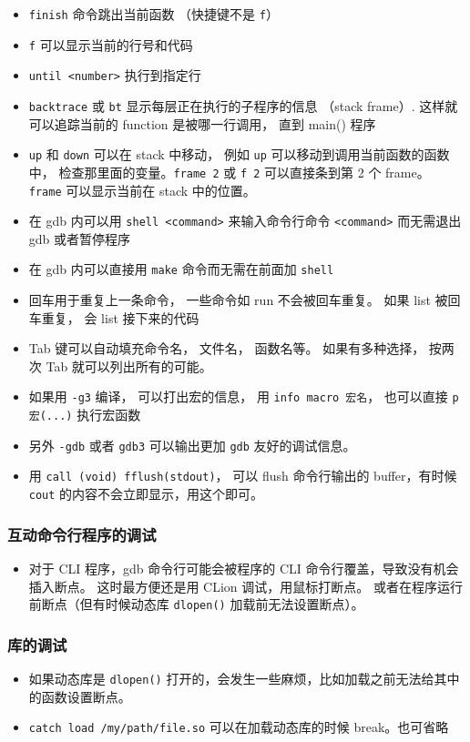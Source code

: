 \begin{itemize}
\item \verb`finish` 命令跳出当前函数 （快捷键不是 \verb`f`）
\item \verb`f` 可以显示当前的行号和代码
\item \verb`until <number>` 执行到指定行
\item \verb`backtrace` 或 \verb`bt` 显示每层正在执行的子程序的信息 （stack frame）. 这样就可以追踪当前的 function 是被哪一行调用， 直到 main() 程序
\item \verb`up` 和 \verb`down` 可以在 stack 中移动， 例如 \verb`up` 可以移动到调用当前函数的函数中， 检查那里面的变量。\verb`frame 2` 或 \verb`f 2` 可以直接条到第 2 个 frame。 \verb`frame` 可以显示当前在 stack 中的位置。
\item 在 gdb 内可以用 \verb`shell <command>` 来输入命令行命令 \verb`<command>` 而无需退出 gdb 或者暂停程序
\item 在 gdb 内可以直接用 \verb`make` 命令而无需在前面加 \verb`shell`
\item 回车用于重复上一条命令， 一些命令如 run 不会被回车重复。 如果 list 被回车重复， 会 list 接下来的代码
\item Tab 键可以自动填充命令名， 文件名， 函数名等。 如果有多种选择， 按两次 Tab 就可以列出所有的可能。
\item 如果用 \verb`-g3` 编译， 可以打出宏的信息， 用 \verb`info macro 宏名`， 也可以直接 \verb`p 宏(...)` 执行宏函数
\item 另外 \verb`-gdb` 或者 \verb`gdb3` 可以输出更加 \verb`gdb` 友好的调试信息。
\item 用 \verb`call (void) fflush(stdout)`， 可以 flush 命令行输出的 buffer，有时候 \verb`cout` 的内容不会立即显示，用这个即可。
\end{itemize}

\subsubsection{互动命令行程序的调试}
\begin{itemize}
\item 对于 CLI 程序，gdb 命令行可能会被程序的 CLI 命令行覆盖，导致没有机会插入断点。 这时最方便还是用 CLion 调试，用鼠标打断点。 或者在程序运行前断点（但有时候动态库 \verb`dlopen()` 加载前无法设置断点）。
\end{itemize}


\subsubsection{库的调试}
\begin{itemize}
\item 如果动态库是 \verb`dlopen()` 打开的，会发生一些麻烦，比如加载之前无法给其中的函数设置断点。
\item \verb`catch load /my/path/file.so` 可以在加载动态库的时候 break。也可省略 
\end{itemize}

